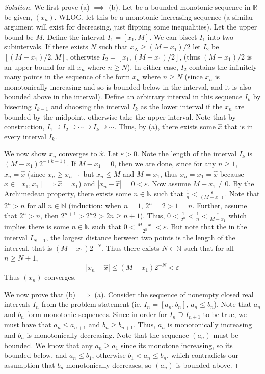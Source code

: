 \documentclass{article}
\newcommand{\N}{{\mathbb N}}
\newcommand{\R}{{\mathbb R}}
\newcommand{\ep}{{\varepsilon}}
\begin{document}
\begin{proof}[Solution]\let\qed\relax
	We first prove (a) $\implies$ (b).
	Let be a bounded monotonic sequence in $\R$ be given, $(x_n)$.
	WLOG, let this be a monotonic increasing sequence
	(a similar argument will exist for decreasing,
	just flipping some inequalities).
	Let the upper bound be $M$.
	Define the interval $I_1 = [x_1, M]$.
	We can bisect $I_1$ into two subintervals.
	If there exists $N$ such that $x_N \geq (M-x_1)/2$
	let $I_2$ be $[(M-x_1)/2, M]$,
	otherwise $I_2 = [x_1,(M-x_1)/2]$,
	(thus $(M-x_1)/2$ is an upper bound for all $x_n$ where $n\geq N$).
	In either case, $I_2$ contains the infinitely many points
	in the sequence of the form $x_n$ where $n \geq N$
	(since $x_n$ is monotonically increasing and so is bounded below in the interval,
	and it is also bounded above in the interval).
	Define an arbitrary interval in this sequence $I_k$
	by bisecting $I_{k-1}$ and choosing the interval $I_k$
	as the lower interval if the $x_n$ are bounded by the midpoint,
	otherwise take the upper interval.
	Note that by construction, $I_1 \supseteq I_2 \supseteq \cdots \supseteq I_k \supseteq \cdots$.
	Thus, by (a), there exists some $\hat{x}$ that is in every interval $I_k$.

	We now show $x_n$ converges to $\hat{x}$.
	Let $\ep > 0$.
	Note the length of the interval $I_k$ is $(M-x_1)2^{-(k-1)}$. 
	If $M - x_1 = 0$, then we are done,
	since for any $n \geq 1$, $x_n = \hat{x}$
	(since $x_n \geq x_{n-1}$ but $x_n \leq M$ and $M = x_1$,
	thus $x_n = x_1 = \hat{x}$ because $\hat{x} \in [x_1,x_1] \implies \hat{x} = x_1$)
	and $|x_n - \hat{x}| = 0 < \ep$.
	Now assume $M - x_1 \neq 0$.
	By the Archimedean property, there exists some $n \in \N$ such that $\frac{1}{n} < \frac{\ep}{(M - x_1)}$.
	Note that $2^n > n$ for all $n \in \N$
	(induction: when $n=1$, $2^n = 2 > 1 = n$.
	Further, assume that $2^n > n$, then $2^{n+1} > 2^n2 > 2n \geq n + 1$).
	Thus, $0 < \frac{1}{2^n} < \frac{1}{n} < \frac{\ep}{M-x_1}$
	which implies there is some $n \in \N$ such that $0 < \frac{M-x_1}{2^n} < \ep$.
	But note that the in the interval $I_{N+1}$, the largest distance between
	two points is the length of the interval, that is $(M-x_1)2^{-N}$.
	Thus there exists $N\in \N$ such that for all $n \geq N+1$,
	\[
		|x_n - \hat{x}| \leq (M-x_1)2^{-N} < \ep
	\]
	Thus $(x_n)$ converges.

	We now prove that (b) $\implies$ (a).
	Consider the sequence of nonempty closed real intervals $I_n$ from the problem statement
	(ie. $I_n = [a_n,b_n]$, $a_n \leq b_n$).
	Note that $a_n$ and $b_n$ form monotonic sequences.
	Since in order for $I_n \supseteq I_{n+1}$ to be true,
	we must have that $a_{n} \leq a_{n+1}$ and $b_{n} \geq b_{n+1}$.
	Thus, $a_n$ is monotonically increasing and $b_n$ is monotonically decreasing.
	Note that the sequence $(a_n)$ must be bounded.
	We know that any $a_n \geq a_1$ since its monotone increasing,
	so its bounded below,
	and $a_n \leq b_1$,
	otherwise $b_1 < a_n \leq b_n$,
	which contradicts our assumption that $b_n$ monotonically decreases,
	so $(a_n)$ is bounded above.


\end{proof}
\end{document}
